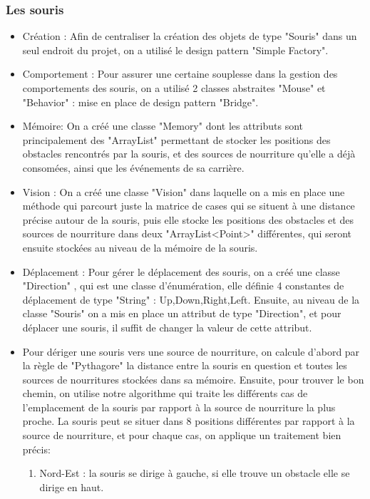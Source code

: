 \subsubsection{Les souris}
\begin{itemize}
\item Création : Afin de centraliser la création des objets de type "Souris" dans un seul endroit du projet, on a utilisé le design pattern "Simple Factory".
\item Comportement : Pour assurer une certaine souplesse dans la gestion des comportements des souris, on a utilisé 2 classes abstraites "Mouse" et "Behavior" : mise en place de design pattern "Bridge".
\item Mémoire: On a créé une classe "Memory" dont les attributs sont principalement des "ArrayList" permettant de stocker les positions des obstacles rencontrés par la souris, et des sources de nourriture qu'elle a déjà consomées, ainsi que les événements de sa carrière. 
\item Vision : On a créé une classe "Vision" dans laquelle on a mis en place une méthode qui parcourt juste la matrice de cases qui se situent à une distance précise autour de la souris, puis elle stocke les positions des obstacles et des sources de nourriture dans deux  
"ArrayList<Point>" différentes, qui seront ensuite stockées au niveau de la mémoire de la souris.
\item Déplacement : Pour gérer le déplacement des souris, on a créé une classe "Direction" , qui est une classe d'énumération, elle définie 4 constantes de déplacement de type "String" : Up,Down,Right,Left. Ensuite, au  niveau de la classe "Souris" on a mis en place un attribut de type "Direction", et pour déplacer une souris, il suffit de changer la valeur de cette attribut.
\item Pour dériger une souris vers une source de nourriture, on calcule d'abord par la règle de "Pythagore" la distance entre la souris en question et toutes les sources de nourritures stockées dans sa mémoire. Ensuite, pour trouver le bon chemin, on utilise notre algorithme qui traite les différents cas de l'emplacement de la souris par rapport à la source de nourriture la plus proche. La souris peut se situer dans 8 positions différentes par rapport à la source de nourriture, et pour chaque cas, on applique un traitement bien précis:
\begin{enumerate}
\item Nord-Est : la souris se dirige à gauche, si elle trouve un obstacle elle se dirige en haut.

\end{enumerate}
\end{itemize}
